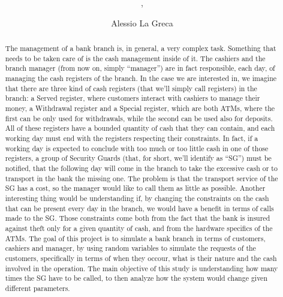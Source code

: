 \documentclass{article}
\title{\centering{\huge{Simulation study for cash management}} \\ \centering{\huge{in a bank branch}}}
\subtitle{\centering{Project for the Simulation course held by Professor Alberto Ceselli}, \\ \centering{University of Milan, July 2022}}
\author{Alessio La Greca}
\date{}
\begin{document}
\maketitle

\begin{abstract}
The management of a bank branch is, in general, a very complex task. Something that needs to be taken care of is the cash management inside of it. The cashiers and the branch manager (from now on, simply ``manager'') are in fact responsible, each day, of managing the cash registers of the branch. In the case we are interested in, we imagine that there are three kind of cash registers (that we'll simply call registers) in the branch: a Served register, where customers interact with cashiers to manage their money, a Withdrawal register and a Special register, which are both ATMs, where the first can be only used for withdrawals, while the second can be used also for deposits. All of these registers have a bounded quantity of cash that they can contain, and each working day must end with the registers respecting their constraints. In fact, if a working day is expected to conclude with too much or too little cash in one of those registers, a group of Security Guards (that, for short, we'll identify as ``SG'') must be notified, that the following day will come in the branch to take the excessive cash or to transport in the bank the missing one. The problem is that the transport service of the SG has a cost, so the manager would like to call them as little as possible. Another interesting thing would be understanding if, by changing the constraints on the cash that can be present every day in the branch, we would have a benefit in terms of calls made to the SG. Those constraints come both from the fact that the bank is insured against theft only for a given quantity of cash, and from the hardware specifics of the ATMs. The goal of this project is to simulate a bank branch in terms of customers, cashiers and manager, by using random variables to simulate the requests of the customers, specifically in terms of when they occour, what is their nature and the cash involved in the operation. The main objective of this study is understanding how many times the SG have to be called, to then analyze how the system would change given different parameters.

\end{abstract}

{
  \hypersetup{linkcolor=black}
  \tableofcontents
}
\end{document}
